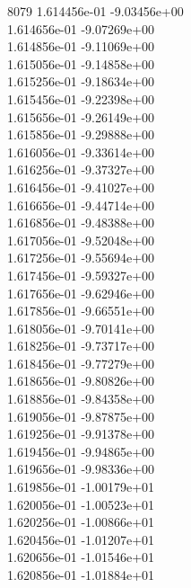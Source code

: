 8079	1.614456e-01	-9.03456e+00	\\ 	1.614656e-01	-9.07269e+00	\\ 	1.614856e-01	-9.11069e+00	\\ 	1.615056e-01	-9.14858e+00	\\ 	1.615256e-01	-9.18634e+00	\\ 	1.615456e-01	-9.22398e+00	\\ 	1.615656e-01	-9.26149e+00	\\ 	1.615856e-01	-9.29888e+00	\\ 	1.616056e-01	-9.33614e+00	\\ 	1.616256e-01	-9.37327e+00	\\ 	1.616456e-01	-9.41027e+00	\\ 	1.616656e-01	-9.44714e+00	\\ 	1.616856e-01	-9.48388e+00	\\ 	1.617056e-01	-9.52048e+00	\\ 	1.617256e-01	-9.55694e+00	\\ 	1.617456e-01	-9.59327e+00	\\ 	1.617656e-01	-9.62946e+00	\\ 	1.617856e-01	-9.66551e+00	\\ 	1.618056e-01	-9.70141e+00	\\ 	1.618256e-01	-9.73717e+00	\\ 	1.618456e-01	-9.77279e+00	\\ 	1.618656e-01	-9.80826e+00	\\ 	1.618856e-01	-9.84358e+00	\\ 	1.619056e-01	-9.87875e+00	\\ 	1.619256e-01	-9.91378e+00	\\ 	1.619456e-01	-9.94865e+00	\\ 	1.619656e-01	-9.98336e+00	\\ 	1.619856e-01	-1.00179e+01	\\ 	1.620056e-01	-1.00523e+01	\\ 	1.620256e-01	-1.00866e+01	\\ 	1.620456e-01	-1.01207e+01	\\ 	1.620656e-01	-1.01546e+01	\\ 	1.620856e-01	-1.01884e+01	\\ \hline
